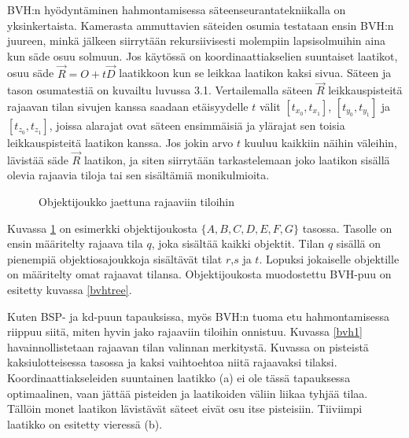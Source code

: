 \documentclass[a4paper, 12pt, titlepage]{article}
\begin{document}
BVH:n hyödyntäminen hahmontamisessa säteenseurantatekniikalla on yksinkertaista. Kamerasta ammuttavien säteiden osumia testataan ensin BVH:n juureen, minkä jälkeen siirrytään rekursiivisesti molempiin lapsisolmuihin aina kun säde osuu solmuun. Jos käytössä on koordinaattiakselien suuntaiset laatikot, osuu säde $\vec{R}=O+t\vec{D}$ laatikkoon kun se leikkaa laatikon kaksi sivua. Säteen ja tason osumatestiä on kuvailtu luvussa 3.1. Vertailemalla säteen $\vec{R}$ leikkauspisteitä rajaavan tilan sivujen kanssa saadaan etäisyydelle $t$ välit $[t_{x_0}, t_{x_1}]$, $[t_{y_0}, t_{y_1}]$ ja $[t_{z_0}, t_{z_1}]$, joissa alarajat ovat säteen ensimmäisiä ja ylärajat sen toisia leikkauspisteitä laatikon kanssa. Jos jokin arvo $t$ kuuluu kaikkiin näihin väleihin, lävistää säde $\vec{R}$ laatikon, ja siten siirrytään tarkastelemaan joko laatikon sisällä olevia rajaavia tiloja tai sen sisältämiä monikulmioita. \citep[.]{janke}\\

\begin{figure}[htp]
 \centering 
 \def\svgwidth{0.8\linewidth}
 
 \caption{Objektijoukko jaettuna rajaaviin tiloihin}
 \vspace{-0.5cm} 
 \label{bvh}
\end{figure}

Kuvassa \ref{bvh} on esimerkki objektijoukosta $\{A,B,C,D,E,F,G\}$ tasossa. Tasolle on ensin määritelty rajaava tila $q$, joka sisältää kaikki objektit. Tilan $q$ sisällä on pienempiä objektiosajoukkoja sisältävät tilat $r$,$s$ ja $t$. Lopuksi jokaiselle objektille on määritelty omat rajaavat tilansa. Objektijoukosta muodostettu BVH-puu on esitetty kuvassa \ref{bvhtree}.   



Kuten BSP- ja kd-puun tapauksissa, myös BVH:n tuoma etu hahmontamisessa riippuu siitä, miten hyvin jako rajaaviin tiloihin onnistuu. Kuvassa \ref{bvh1} havainnollistetaan rajaavan tilan valinnan merkitystä. Kuvassa on pisteistä kaksiulotteisessa tasossa ja kaksi vaihtoehtoa niitä rajaavaksi tilaksi. Koordinaattiakseleiden suuntainen laatikko (a) ei ole tässä tapauksessa optimaalinen, vaan jättää pisteiden ja laatikoiden väliin liikaa tyhjää tilaa. Tällöin monet laatikon lävistävät säteet eivät osu itse pisteisiin. Tiiviimpi laatikko on esitetty vieressä (b).\\
\end{document}

